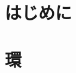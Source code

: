 \documentclass[8pt,x11names]{ltjsarticle}
\theoremstyle{definition}
\begin{document}
\section*{はじめに}

\section{環}















% 
% 



\end{document}
